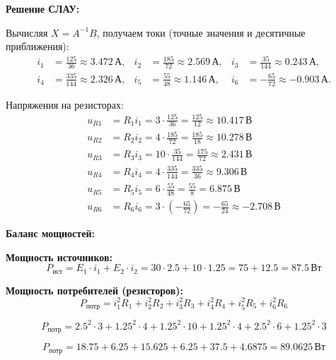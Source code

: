 \textbf{Решение СЛАУ:}

Вычисляя $X = A^{-1}B$, получаем токи (точные значения и десятичные приближения):
\[
\begin{aligned}
 i_1 &= \tfrac{125}{36} \approx 3.472\,\text{А}, &
 i_2 &= \tfrac{185}{72} \approx 2.569\,\text{А}, &
 i_3 &= \tfrac{35}{144} \approx 0.243\,\text{А}, \\
 i_4 &= \tfrac{335}{144} \approx 2.326\,\text{А}, &
 i_5 &= \tfrac{55}{48} \approx 1.146\,\text{А}, &
 i_6 &= -\tfrac{65}{72} \approx -0.903\,\text{А}.
\end{aligned}
\]

Напряжения на резисторах:
\begin{align*}
u_{R1} &= R_1 i_1 = 3\cdot\tfrac{125}{36} = \tfrac{125}{12} \approx 10.417\,\text{В} \\
u_{R2} &= R_2 i_2 = 4\cdot\tfrac{185}{72} = \tfrac{185}{18} \approx 10.278\,\text{В} \\
u_{R3} &= R_3 i_3 = 10\cdot\tfrac{35}{144} = \tfrac{175}{72} \approx 2.431\,\text{В} \\
u_{R4} &= R_4 i_4 = 4\cdot\tfrac{335}{144} = \tfrac{335}{36} \approx 9.306\,\text{В} \\
u_{R5} &= R_5 i_5 = 6\cdot\tfrac{55}{48} = \tfrac{55}{8} = 6.875\,\text{В} \\
u_{R6} &= R_6 i_6 = 3\cdot\left(-\tfrac{65}{72}\right) = -\tfrac{65}{24} \approx -2.708\,\text{В}
\end{align*}

\textbf{Баланс мощностей:}

\textbf{Мощность источников:}
\begin{equation}
P_{\text{ист}} = E_1 \cdot i_1 + E_2 \cdot i_2 = 30 \cdot 2.5 + 10 \cdot 1.25 = 75 + 12.5 = 87.5\,\text{Вт}
\end{equation}

\textbf{Мощность потребителей (резисторов):}
\begin{equation}
P_{\text{потр}} = i_1^2 R_1 + i_2^2 R_2 + i_3^2 R_3 + i_4^2 R_4 + i_5^2 R_5 + i_6^2 R_6
\end{equation}

\begin{equation}
P_{\text{потр}} = 2.5^2 \cdot 3 + 1.25^2 \cdot 4 + 1.25^2 \cdot 10 + 1.25^2 \cdot 4 + 2.5^2 \cdot 6 + 1.25^2 \cdot 3
\end{equation}

\begin{equation}
P_{\text{потр}} = 18.75 + 6.25 + 15.625 + 6.25 + 37.5 + 4.6875 = 89.0625\,\text{Вт}
\end{equation}

